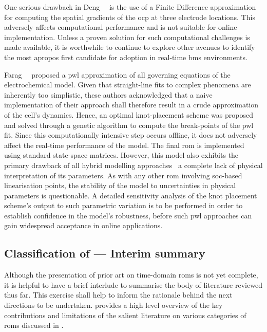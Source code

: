 One  serious drawback  in Deng~\etal{}~\cite{Deng2018}  is the  use of  a Finite
Difference approximation for computing the spatial gradients of the \gls{ocp} at
three electrode locations. This  adversely affects computational performance and
is not  suitable for online  implementation. Unless  a proven solution  for such
computational  challenges is  made available,  it is  worthwhile to  continue to
explore other avenues to identify the  most apropos first candidate for adoption
in real-time \gls{bms} environments.

Farag~\etal{}~\cite{Farag2017}  proposed   a  \gls{pwl}  approximation   of  all
governing equations of the electrochemical  model. Given that straight-line fits
to complex phenomena  are inherently too simplistic,  these authors acknowledged
that a naive implementation of their  approach shall therefore result in a crude
approximation of  the cell's dynamics.  Hence, an optimal  knot-placement scheme
was proposed and solved through a  genetic algorithm to compute the break-points
of the \gls{pwl} fit. Since  this computationally intensive step occurs offline,
it does not  adversely affect the real-time performance of  the model. The final
\gls{rom}  is implemented  using  standard state-space  matrices. However,  this
model  also exhibits  the primary  drawback of  all hybrid  modelling approaches
\ie~a complete lack of physical  interpretation of its parameters. As with any
other \gls{rom} involving \gls{soc}-based linearisation points, the stability of
the model  to uncertainties in  physical parameters is questionable.  A detailed
sensitivity analysis  of the knot  placement scheme's output to  such parametric
variation is  to be performed  in order to  establish confidence in  the model's
robustness, before such  \gls{pwl} approaches can gain  widespread acceptance in
online applications.

\subsection{Classification of  --- Interim summary}

Although the  presentation of prior art on time-domain \glspl{rom} is not yet
complete, it is helpful to have a brief interlude to summarise the body of
literature reviewed thus far. This exercise shall help to inform the rationale
behind the next directions to be undertaken.
 provides a high level overview of the
key contributions and limitations of the salient literature on various
categories of \glspl{rom} discussed in
.

